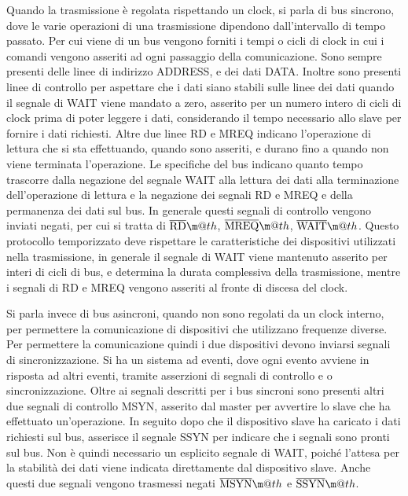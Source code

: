 \documentclass{article}
\makeatletter
\newcommand*{\textoverline}[1]{$\overline{\hbox{#1}}\m@th$}
\numberwithin{equation}{subsection}
\makeatother
\begin{document}

Quando la trasmissione è regolata rispettando un clock, si parla di bus sincrono, dove le varie operazioni di una trasmissione dipendono dall'intervallo di tempo 
passato. Per cui viene di un bus vengono forniti i tempi o cicli di clock in cui i comandi vengono asseriti ad ogni passaggio della comunicazione. 
Sono sempre presenti delle linee di indirizzo ADDRESS, e dei dati DATA. Inoltre sono presenti linee di controllo per aspettare che i dati siano stabili sulle linee dei dati 
quando il segnale di WAIT viene mandato a zero, asserito per un numero intero di cicli di clock prima di poter leggere i dati, considerando il tempo necessario allo slave 
per fornire i dati richiesti. Altre due linee RD e MREQ indicano l'operazione di lettura che si sta effettuando, quando sono asseriti, e durano fino a quando non viene terminata 
l'operazione. Le specifiche del bus indicano quanto tempo trascorre dalla negazione del segnale WAIT alla lettura dei dati alla terminazione dell'operazione di lettura e la 
negazione dei segnali RD e MREQ e della permanenza dei dati sul bus. 
In generale questi segnali di controllo vengono inviati negati, per cui si tratta di \textoverline{RD}, \textoverline{MREQ}, \textoverline{WAIT}. 
Questo protocollo temporizzato deve rispettare le caratteristiche dei dispositivi utilizzati nella trasmissione, in generale il segnale di WAIT viene mantenuto 
asserito per interi di cicli di bus, e determina la durata complessiva della trasmissione, mentre i segnali di RD e MREQ vengono asseriti al fronte di discesa del clock. 


Si parla invece di bus asincroni, quando non sono regolati da un clock interno, per permettere la comunicazione di dispositivi che utilizzano frequenze diverse. Per permettere 
la comunicazione quindi i due dispositivi devono inviarsi segnali di sincronizzazione. Si ha un sistema ad eventi, dove ogni evento avviene in risposta ad altri eventi, 
tramite asserzioni di segnali di controllo e o sincronizzazione. Oltre ai segnali descritti per i bus sincroni sono presenti altri due segnali di controllo MSYN, asserito 
dal master per avvertire lo slave che ha effettuato un'operazione. In seguito dopo che il dispositivo slave ha caricato i dati richiesti sul bus, asserisce il segnale 
SSYN per indicare che i segnali sono pronti sul bus. Non è quindi necessario un esplicito segnale di WAIT, poiché l'attesa per la stabilità dei dati viene indicata 
direttamente dal dispositivo slave. Anche questi due segnali vengono trasmessi negati \textoverline{MSYN} e \textoverline{SSYN}. 
\end{document}
